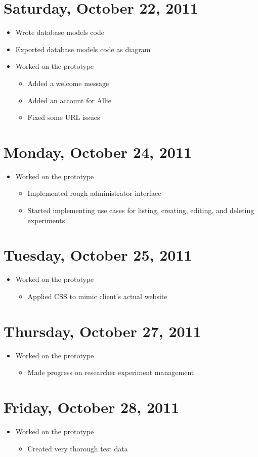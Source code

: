 \documentclass{article}
\begin{document}
\section{Saturday, October 22, 2011}
\begin{itemize}
\item Wrote database models code
\item Exported database models code as diagram
\item Worked on the prototype
    \begin{itemize}
    \item Added a welcome message
    \item Added an account for Allie
    \item Fixed some URL issues
    \end{itemize}
\end{itemize}

\section{Monday, October 24, 2011}
\begin{itemize}
\item Worked on the prototype
    \begin{itemize}
    \item Implemented rough administrator interface
    \item Started implementing use cases for listing, creating, editing, and deleting experiments
    \end{itemize}
\end{itemize}

\section{Tuesday, October 25, 2011}
\begin{itemize}
\item Worked on the prototype
    \begin{itemize}
    \item Applied CSS to mimic client's actual website
    \end{itemize}
\end{itemize}

\section{Thursday, October 27, 2011}
\begin{itemize}
\item Worked on the prototype
    \begin{itemize}
    \item Made progress on researcher experiment management
    \end{itemize}
\end{itemize}

\section{Friday, October 28, 2011}
\begin{itemize}
\item Worked on the prototype
    \begin{itemize}
    \item Created very thorough test data
    \end{itemize}
\end{itemize}
\end{document}
